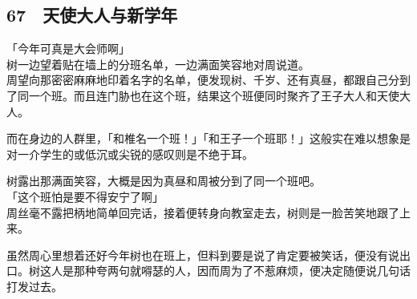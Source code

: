 \subsection{67　天使大人与新学年}

「今年可真是大会师啊」\\

树一边望着贴在墙上的分班名单，一边满面笑容地对周说道。\\

周望向那密密麻麻地印着名字的名单，便发现树、千岁、还有真昼，都跟自己分到了同一个班。而且连门胁也在这个班，结果这个班便同时聚齐了王子大人和天使大人。

而在身边的人群里，「和椎名一个班！」「和王子一个班耶！」这般实在难以想象是对一介学生的或低沉或尖锐的感叹则是不绝于耳。

树露出那满面笑容，大概是因为真昼和周被分到了同一个班吧。\\

「这个班怕是要不得安宁了啊」\\

周丝毫不露把柄地简单回完话，接着便转身向教室走去，树则是一脸苦笑地跟了上来。

虽然周心里想着还好今年树也在班上，但料到要是说了肯定要被笑话，便没有说出口。树这人是那种夸两句就嘚瑟的人，因而周为了不惹麻烦，便决定随便说几句话打发过去。\\

